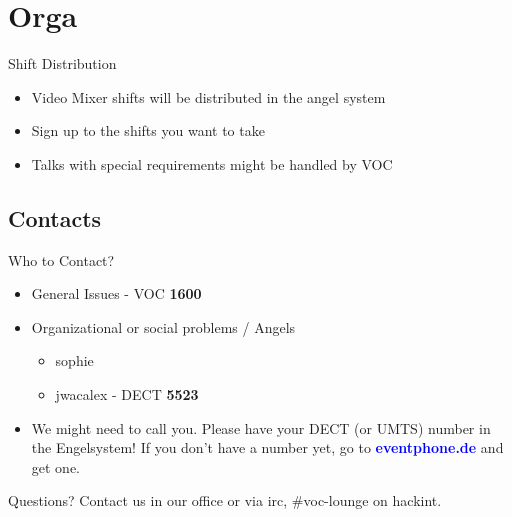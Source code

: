 \documentclass[aspectratio=169]{beamer}
\begin{document}
\section{Orga} 		
\begin{frame}{Shift Distribution}		%
\begin{itemize}
	\item Video Mixer shifts will be distributed in the angel system
	\item Sign up to the shifts you want to take
	\item Talks with special requirements might be handled by VOC
\end{itemize} 
\end{frame}

\subsection{Contacts}			%
\begin{frame}{Who to Contact?}
\begin{itemize}
	\item General Issues - VOC \textbf{1600}
	\item Organizational or social problems / Angels
	\begin{itemize}
		\item sophie
		\item jwacalex - DECT \textbf{5523}
	\end{itemize}
	\item We might need to call you. Please have your DECT (or UMTS) number in the Engelsystem! If you don't have a number yet, go to 
	\textcolor{blue}{\textbf{eventphone.de}} and get one. 
\end{itemize} 
\end{frame}

\begin{frame}{Questions?}
Contact us in our office or via irc, \#voc-lounge on hackint.
\end{frame}
\end{document}
